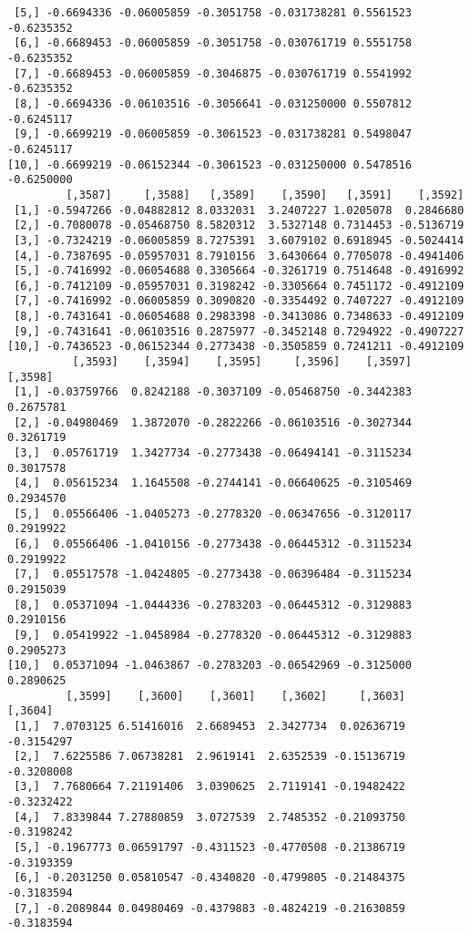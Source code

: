 \documentclass[
  letterpaper,
  DIV=11,
  numbers=noendperiod]{scrreprt}
\begin{document}
\begin{verbatim}
 [5,] -0.6694336 -0.06005859 -0.3051758 -0.031738281 0.5561523 -0.6235352
 [6,] -0.6689453 -0.06005859 -0.3051758 -0.030761719 0.5551758 -0.6235352
 [7,] -0.6689453 -0.06005859 -0.3046875 -0.030761719 0.5541992 -0.6235352
 [8,] -0.6694336 -0.06103516 -0.3056641 -0.031250000 0.5507812 -0.6245117
 [9,] -0.6699219 -0.06005859 -0.3061523 -0.031738281 0.5498047 -0.6245117
[10,] -0.6699219 -0.06152344 -0.3061523 -0.031250000 0.5478516 -0.6250000
         [,3587]     [,3588]   [,3589]    [,3590]   [,3591]    [,3592]
 [1,] -0.5947266 -0.04882812 8.0332031  3.2407227 1.0205078  0.2846680
 [2,] -0.7080078 -0.05468750 8.5820312  3.5327148 0.7314453 -0.5136719
 [3,] -0.7324219 -0.06005859 8.7275391  3.6079102 0.6918945 -0.5024414
 [4,] -0.7387695 -0.05957031 8.7910156  3.6430664 0.7705078 -0.4941406
 [5,] -0.7416992 -0.06054688 0.3305664 -0.3261719 0.7514648 -0.4916992
 [6,] -0.7412109 -0.05957031 0.3198242 -0.3305664 0.7451172 -0.4912109
 [7,] -0.7416992 -0.06005859 0.3090820 -0.3354492 0.7407227 -0.4912109
 [8,] -0.7431641 -0.06054688 0.2983398 -0.3413086 0.7348633 -0.4912109
 [9,] -0.7431641 -0.06103516 0.2875977 -0.3452148 0.7294922 -0.4907227
[10,] -0.7436523 -0.06152344 0.2773438 -0.3505859 0.7241211 -0.4912109
          [,3593]    [,3594]    [,3595]     [,3596]    [,3597]   [,3598]
 [1,] -0.03759766  0.8242188 -0.3037109 -0.05468750 -0.3442383 0.2675781
 [2,] -0.04980469  1.3872070 -0.2822266 -0.06103516 -0.3027344 0.3261719
 [3,]  0.05761719  1.3427734 -0.2773438 -0.06494141 -0.3115234 0.3017578
 [4,]  0.05615234  1.1645508 -0.2744141 -0.06640625 -0.3105469 0.2934570
 [5,]  0.05566406 -1.0405273 -0.2778320 -0.06347656 -0.3120117 0.2919922
 [6,]  0.05566406 -1.0410156 -0.2773438 -0.06445312 -0.3115234 0.2919922
 [7,]  0.05517578 -1.0424805 -0.2773438 -0.06396484 -0.3115234 0.2915039
 [8,]  0.05371094 -1.0444336 -0.2783203 -0.06445312 -0.3129883 0.2910156
 [9,]  0.05419922 -1.0458984 -0.2778320 -0.06445312 -0.3129883 0.2905273
[10,]  0.05371094 -1.0463867 -0.2783203 -0.06542969 -0.3125000 0.2890625
         [,3599]    [,3600]    [,3601]    [,3602]     [,3603]    [,3604]
 [1,]  7.0703125 6.51416016  2.6689453  2.3427734  0.02636719 -0.3154297
 [2,]  7.6225586 7.06738281  2.9619141  2.6352539 -0.15136719 -0.3208008
 [3,]  7.7680664 7.21191406  3.0390625  2.7119141 -0.19482422 -0.3232422
 [4,]  7.8339844 7.27880859  3.0727539  2.7485352 -0.21093750 -0.3198242
 [5,] -0.1967773 0.06591797 -0.4311523 -0.4770508 -0.21386719 -0.3193359
 [6,] -0.2031250 0.05810547 -0.4340820 -0.4799805 -0.21484375 -0.3183594
 [7,] -0.2089844 0.04980469 -0.4379883 -0.4824219 -0.21630859 -0.3183594

\end{verbatim}
\end{document}
